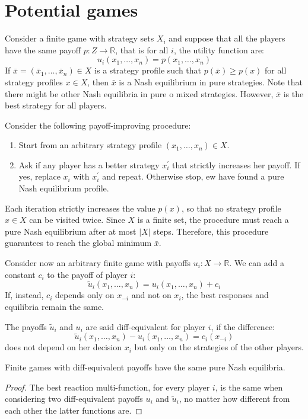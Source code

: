 \section{Potential games}

Consider a finite game with strategy sets $X_i$ and suppose that all the players have the same payoff $p:Z\rightarrow\mathbb{R}$, that is for all $i$, the utility function are: 
\[u_i(x_1,\dots,x_n)=p(x_1,\dots,x_n)\]
\noindent If $\bar{x}=(\bar{x}_1,\dots,\bar{x}_n)\in X$ is a strategy profile such that $p(\bar{x})\geq p(x)$ for all strategy profiles $x\in X$, then $\bar{x}$ is a Nash equilibrium in pure strategies. 
Note that there might be other Nash equilibria in pure o mixed strategies. 
However, $\bar{x}$ is the best strategy for all players. 

Consider the following payoff-improving procedure: 
\begin{enumerate}
    \item Start from an arbitrary strategy profile $(x_1,\dots,x_n)\in X$. 
    \item Ask if any player has a better strategy $x_i^\prime$ that strictly increases her payoff. 
        If yes, replace $x_i$ with $x_i^\prime$ and repeat. 
        Otherwise stop, ew have found a pure Nash equilibrium profile. 
\end{enumerate}
\noindent Each iteration strictly increases the value $p(x)$, so that no strategy profile $x\in X$ can be visited twice. 
Since $X$ is a finite set, the procedure must reach a pure Nash equilibrium after at most $\left\lvert X \right\rvert$ steps.
Therefore, this procedure guarantees to reach the global minimum $\bar{x}$. 

Consider now an arbitrary finite game with payoffs $u_i:X\rightarrow\mathbb{R}$. 
We can add a constant $c_i$ to the payoff of player $i$: 
\[\tilde{u}_i(x_1,\dots,x_n)=u_i(x_1,\dots,x_n)+c_i\]
If, instead, $c_i$ depends only on $x_{-i}$ and not on $x_i$, the best responses and equilibria remain the same. 
\begin{definition}
    The payoffs $\tilde{u}_i$ and $u_i$ are said diff-equivalent for player $i$, if the difference: 
    \[\tilde{u}_i(x_1,\dots,x_n)-u_i(x_1,\dots,x_n)=c_i(x_{-i})\]
    does not depend on her decision $x_i$ but only on the strategies of the other players.
\end{definition}
\begin{theorem}
    Finite games with diff-equivalent payoffs have the same pure Nash equilibria. 
\end{theorem}
\begin{proof}
    The best reaction multi-function, for every player $i$, is the same when considering two diff-equivalent payoffs $u_i$ and $\tilde{u}_i$, no matter how different from each other the latter functions are. 
\end{proof}


